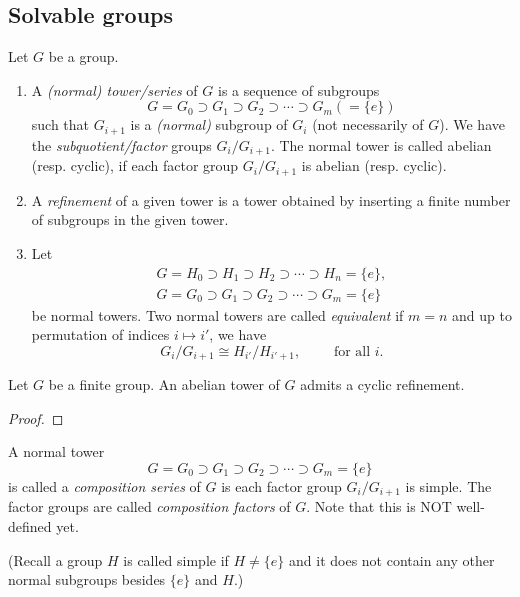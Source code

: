\subsection{Solvable groups}

\begin{definition}
    Let $G$ be a group.
    \begin{enumerate}
        \item A {\em (normal) tower/series} of $G$ is a sequence of subgroups
              \[
                  G = G_0 \supset G_1 \supset G_2 \supset \cdots \supset G_m  (= \{e\})
              \]
              such that $G_{i+1}$ is a {\em (normal)} subgroup of $G_i$ (not necessarily of $G$). We have the {\em subquotient/factor} groups $G_i/ G_{i+1}$. The normal tower is called abelian (resp. cyclic), if each factor group $G_i/ G_{i+1}$ is abelian (resp. cyclic).

        \item A {\em refinement} of a given tower is a tower obtained by inserting a finite number of subgroups in the given tower.

        \item Let
              \[
                  \begin{split}
                      G = H_0 \supset H_1 \supset H_2 \supset \cdots \supset H_n = \{e\},\\
                      G = G_0 \supset G_1 \supset G_2 \supset \cdots \supset G_m = \{e\}
                  \end{split}
              \]
              be normal towers. Two normal towers are called {\em equivalent} if $m = n$ and up to permutation of indices $i \mapsto i'$, we have
              \[
                  G_i/ G_{i+1} \cong H_{i'}/ H_{i'+1}, \qquad \text{ for all } i.
              \]
    \end{enumerate}
\end{definition}

\begin{lem}
    Let $G$ be a finite group. An abelian tower of $G$ admits a cyclic refinement.
\end{lem}
\begin{proof}

\end{proof}

\begin{definition}
    A normal tower
    \[
        G = G_0 \supset G_1 \supset G_2 \supset \cdots \supset G_m = \{e\}
    \]
    is called a {\em composition series} of $G$ is each factor group $G_i/G_{i+1}$ is simple. The factor groups are called {\em composition factors} of $G$. Note that this is NOT well-defined yet.

    (Recall a group $H$ is called simple if $H\neq \{e\}$ and it does not contain any other normal subgroups besides $\{e\}$ and $H$.)
\end{definition}

